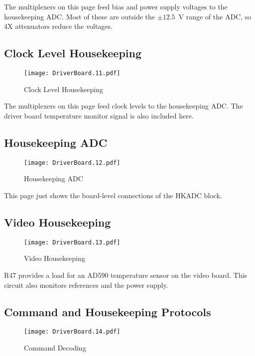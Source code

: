 \documentclass[a4paper,12pt]{article}
\begin{document}
The multiplexers on this page feed bias and power supply voltages to the housekeeping ADC. Most of these are outside the $\pm 12.5$\ V range of the ADC, so 4X attenuators reduce the voltages.

\subsection{Clock Level Housekeeping}
   \begin{figure}
   \begin{center}
   \texttt{[image: DriverBoard.11.pdf]}
   \end{center}
   \caption{Clock Level Housekeeping}
   \end{figure}

The multiplexers on this page feed clock levels to the housekeeping ADC. The driver board temperature monitor signal is also included here.

\subsection{Housekeeping ADC}

   \begin{figure}
   \begin{center}
   \texttt{[image: DriverBoard.12.pdf]}
   \end{center}
   \caption{Housekeeping ADC}
   \end{figure}

This page just shows the board-level connections of the HKADC block.

\subsection{Video Housekeeping}

   \begin{figure}
   \begin{center}
   \texttt{[image: DriverBoard.13.pdf]}
   \end{center}
   \caption{Video Housekeeping}
   \end{figure}


R47 provides a load for an AD590 temperature sensor on the video board. This circuit also monitors references and the power supply.

\subsection{Command and Housekeeping Protocols}
   \begin{figure}
   \begin{center}
   \texttt{[image: DriverBoard.14.pdf]}
   \end{center}
   \caption{Command Decoding}
   \end{figure}
\end{document}
